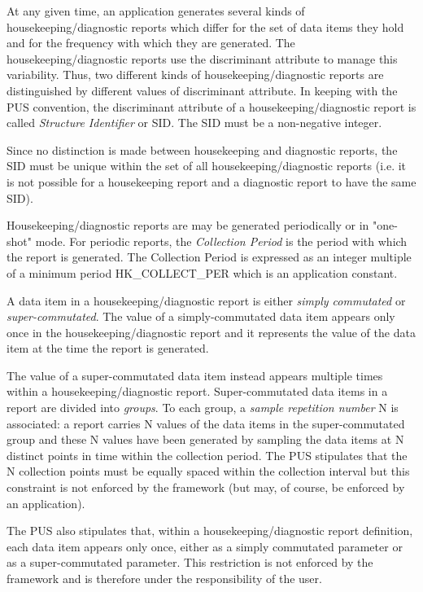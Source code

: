 \documentclass[a4paper,10pt]{article}
\begin{document}
At any given time, an application generates several kinds of housekeeping/diagnostic reports which differ for the set of data items they hold and for the frequency with which they are generated. The housekeeping/diagnostic reports use the discriminant attribute to manage this variability. Thus, two different kinds of housekeeping/diagnostic reports are distinguished by different values of discriminant attribute. In keeping with the PUS convention, the discriminant attribute of a housekeeping/diagnostic report is called \textit{Structure Identifier} or SID. The SID must be a non-negative integer. 

Since no distinction is made between housekeeping and diagnostic reports, the SID must be unique within the set of all housekeeping/diagnostic reports (i.e. it is not possible for a housekeeping report and a diagnostic report to have the same SID).

Housekeeping/diagnostic reports are may be generated periodically or in "one-shot" mode. For periodic reports, the \textit{Collection Period} is the period with which the report is generated. The Collection Period is expressed as an integer multiple of a minimum period HK\_COLLECT\_PER which is an application constant. 

A data item in a housekeeping/diagnostic report is either \textit{simply commutated} or \textit{super-commutated}. The value of a simply-commutated data item appears only once in the housekeeping/diagnostic report and it represents the value of the data item at the time the report is generated.

The value of a super-commutated data item instead appears multiple times within a housekeeping/diagnostic report. Super-commutated data items in a report are divided into \textit{groups}. To each group, a \textit{sample repetition number} N is associated: a report carries N values of the data items in the super-commutated group and these N values have been generated by sampling the data items at N distinct points in time within the collection period. The PUS stipulates that the N collection points must be equally spaced within the collection interval but this constraint is not enforced by the framework (but may, of course, be enforced by an application). 

The PUS also stipulates that, within a housekeeping/diagnostic report definition, each data item appears only once, either as a simply commutated parameter or as a super-commutated parameter. This restriction is not enforced by the framework and is therefore under the responsibility of the user.
\end{document}
